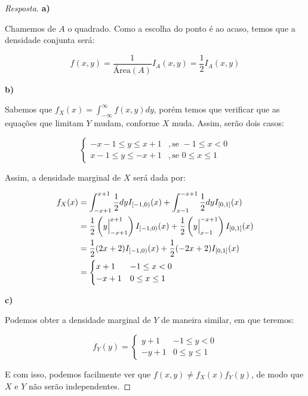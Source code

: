 \documentclass[
]{article}
\theoremstyle{definition}
\theoremstyle{definition}
\theoremstyle{definition}
\theoremstyle{definition}
\theoremstyle{remark}
\begin{document}
\begin{proof}[Resposta]
\textbf{a)}

Chamemos de \(A\) o quadrado. Como a escolha do ponto é ao acaso, temos que a densidade conjunta será:

\begin{equation*}
f(x,y) = \frac{1}{\text{Área}(A)}I_{A}(x,y) = \frac{1}{2}I_{A}(x,y)
\end{equation*}

\textbf{b)}

Sabemos que \(f_{X}(x) = \int_{-\infty}^{\infty}f(x,y)dy\), porém temos que verificar que as equações que limitam \(Y\) mudam, conforme \(X\) muda. Assim, serão dois casos:

\begin{equation*}
\begin{cases}
-x-1 \le y \le x+1 & ,\text{se }-1 \le x < 0 \\
x-1 \le y \le -x+1 & ,\text{se }0 \le x \le 1
\end{cases}
\end{equation*}

Assim, a densidade marginal de \(X\) será dada por:

\begin{align*}
f_{X}(x) &= \int_{-x+1}^{x+1}\frac{1}{2}dy I_{[-1,0)}(x) + \int_{x-1}^{-x+1}\frac{1}{2}dy I_{[0,1]}(x) \\
&= \frac{1}{2}\left(y\Big{|}_{-x+1}^{x+1}\right)I_{[-1,0)}(x) + \frac{1}{2}\left(y\Big{|}_{x-1}^{-x+1}\right)I_{[0,1]}(x) \\
&= \frac{1}{2}(2x+2)I_{[-1,0)}(x) + \frac{1}{2}(-2x+2)I_{[0,1]}(x) \\
&= \begin{cases}
x+1 & -1 \le x < 0 \\
-x+1 & 0 \le x \le 1
\end{cases}
\end{align*}

\textbf{c)}

Podemos obter a densidade marginal de \(Y\) de maneira similar, em que teremos:

\begin{equation*}
f_{Y}(y) = \begin{cases}
y+1 & -1 \le y < 0 \\
-y+1 & 0 \le y \le 1
\end{cases}
\end{equation*}

E com isso, podemos facilmente ver que \(f(x,y) \neq f_{X}(x)f_{Y}(y)\), de modo que \(X\) e \(Y\) não serão independentes.
\end{proof}
\end{document}
